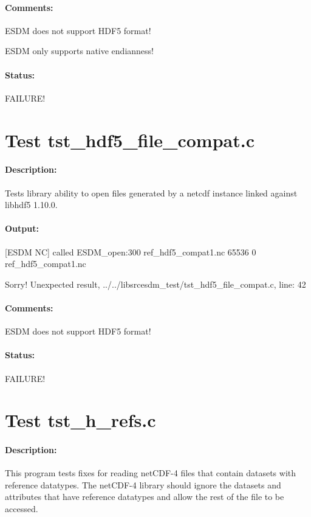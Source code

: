 \paragraph{Comments:} ESDM does not support HDF5 format!

ESDM only supports native endianness!

\paragraph{Status:} FAILURE!

\section{Test tst\_hdf5\_file\_compat.c}

\paragraph{Description:} Tests library ability to open files generated by a netcdf instance linked against libhdf5 1.10.0.

\paragraph{Output:} [ESDM NC] called ESDM\_open:300 ref\_hdf5\_compat1.nc 65536 0 ref\_hdf5\_compat1.nc

Sorry! Unexpected result, ../../libsrcesdm\_test/tst\_hdf5\_file\_compat.c, line: 42

\paragraph{Comments:} ESDM does not support HDF5 format!

\paragraph{Status:} FAILURE!

\section{Test tst\_h\_refs.c}

\paragraph{Description:} This program tests fixes for reading netCDF-4 files that contain datasets with reference datatypes.  The netCDF-4 library should ignore the datasets and attributes that have reference datatypes and allow the rest of the file to be accessed.

